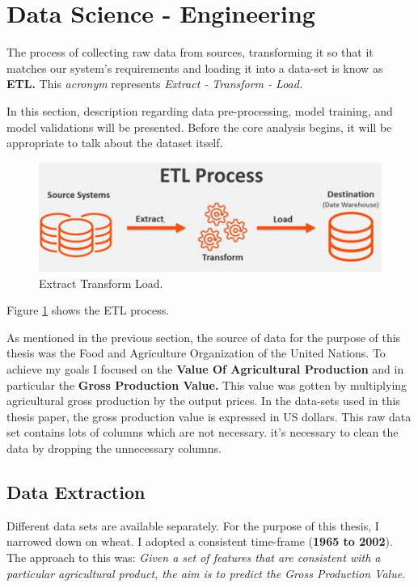 \section{Data Science - Engineering}

The process of collecting raw data from sources, transforming it so that it matches our system's requirements and loading it into a data-set is know as \textbf{ETL.} This \textit{acronym} represents \textit{Extract - Transform - Load.}

In this section, description regarding data pre-processing, model training, and model validations will be presented. Before the core analysis begins, it will be appropriate to talk about the dataset itself.


\begin{figure}[h!]
	\includegraphics[width=\textwidth,height=\textheight,keepaspectratio]{fig/etl.jpg}
	\caption{Extract Transform Load.}
	\label{fig:ETL}
\end{figure}

Figure \ref{fig:ETL} shows the ETL process.

As mentioned in the previous section, the source of data for the purpose of this thesis was the Food and Agriculture Organization of the United Nations. To achieve my goals I focused on the \textbf{Value Of Agricultural Production} and in particular the \textbf{Gross Production Value.} This value was gotten by multiplying agricultural gross production by the output prices. In the data-sets used in this thesis paper, the gross production value is expressed in US dollars. This raw data set contains lots of columns which are not necessary. it's necessary to clean the data by dropping the unnecessary columns. 




\subsection{Data Extraction}

Different data sets are available separately. For the purpose of this thesis, I narrowed down on wheat. I adopted a consistent time-frame (\textbf{1965 to 2002}). The approach to this was: \textit{Given a set of features that are consistent with a particular agricultural product, the aim is to predict the Gross Production Value.}

